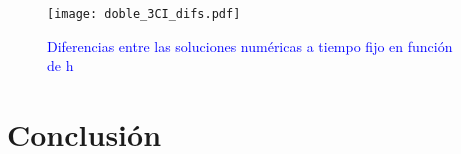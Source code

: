 \documentclass[aps,prb,twocolumn,superscriptaddress,floatfix,longbibliography]{revtex4-2}
\newcounter{para}
\begin{document}
\begin{figure}[h]
  \texttt{[image: doble\_3CI\_difs.pdf]}
  \caption{\textcolor{blue}{Diferencias entre las soluciones numéricas a tiempo fijo en función de h}}
   \label{fig:doble_3CI_difs}
\end{figure}





\section{Conclusión}





\end{document}
